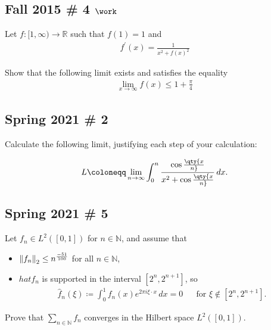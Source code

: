 \hypertarget{fall-2015-4-work}{%
\subsection{\texorpdfstring{Fall 2015 \# 4
\(\work\)}{Fall 2015 \# 4 \textbackslash work}}\label{fall-2015-4-work}}

Let \(f: [1, \infty) \to {\mathbb{R}}\) such that \(f(1) = 1\) and
\begin{align*}
f^{\prime}(x)= \frac{1} {x^{2}+f(x)^{2}}
\end{align*}

Show that the following limit exists and satisfies the equality
\begin{align*}
\lim _{x \rightarrow \infty} f(x) \leq 1 + \frac \pi 4
\end{align*}

\hypertarget{spring-2021-2}{%
\subsection{Spring 2021 \# 2}\label{spring-2021-2}}

Calculate the following limit, justifying each step of your calculation:

\begin{align*}
L \coloneqq\lim_{n\to \infty} \int_0^n { \cos\qty{x\over n} \over x^2 + \cos\qty{x\over n} }\,dx
.\end{align*}

\hypertarget{spring-2021-5}{%
\subsection{Spring 2021 \# 5}\label{spring-2021-5}}

Let \(f_n \in L^2([0, 1])\) for \(n\in {\mathbb{N}}\), and assume that

\begin{itemize}
\item
  \({\left\lVert {f_n} \right\rVert}_2 \leq n^{-51 \over 100}\) for all
  \(n\in {\mathbb{N}}\),
\item
  \(hat{f}_n\) is supported in the interval \([2^n, 2^{n+1}]\), so
  \begin{align*}
  \widehat{f}_n(\xi) \coloneqq\int_0^1 f_n(x) e^{2\pi i \xi \cdot x} \,dx= 0 && \text{for } \xi \not\in [2^n, 2^{n+1}]
  .\end{align*}
\end{itemize}

Prove that \(\sum_{n\in {\mathbb{N}}} f_n\) converges in the Hilbert
space \(L^2([0, 1])\).

